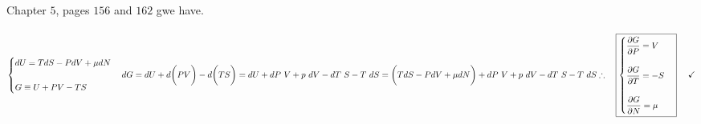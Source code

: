 \documentclass[fleqn]{article}
\begin{document}
\begin{enumerate}
      \textcolor{hwColor}{
        \\
        Chapter $5$, pages $156$ and $162$ gwe have. 
        \\
        \\
        $
          \begin{cases}
            dU=TdS-P dV+\mu dN
            \\
            \\
            G \equiv U+PV-TS
          \end{cases}
          \\
          \\
          \\
          dG=dU+d \bigg( PV \bigg)-d \bigg( TS \bigg)
          =dU+dP ~ V+p ~ dV-dT ~ S-T ~ dS
          \\
          \\
          \\
          =\bigg( TdS-P dV+\mu dN \bigg)+dP ~ V+p ~ dV-dT ~ S-T ~ dS
          \\
          \\
          \\
          \therefore ~~~ \boxed{
            \begin{cases}
              \dfrac{\partial G}{\partial P}=V
              \\
              \\
              \dfrac{\partial G}{\partial T}=-S
              \\
              \\
              \dfrac{\partial G}{\partial N}=\mu
            \end{cases}
          } ~~~~ \checkmark
        $
      }

  \end{enumerate}
\end{document}
